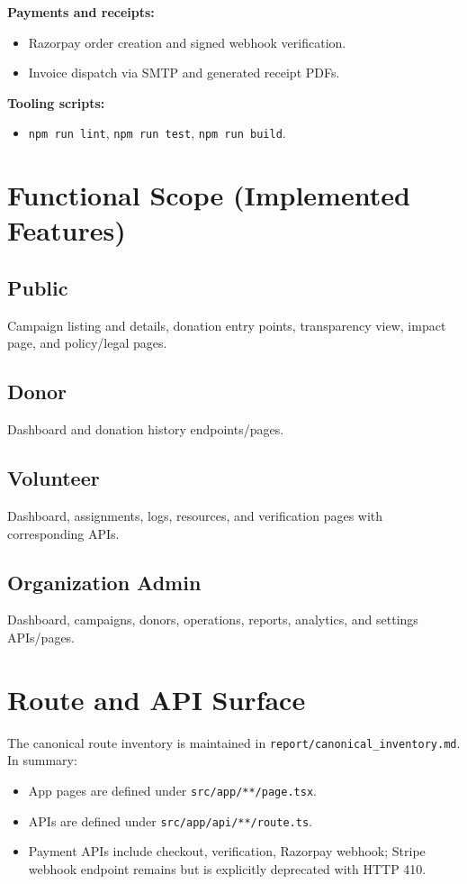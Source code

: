 \documentclass[12pt,a4paper]{article}
\begin{document}
\textbf{Payments and receipts:}
\begin{itemize}
  \item Razorpay order creation and signed webhook verification.
  \item Invoice dispatch via SMTP and generated receipt PDFs.
\end{itemize}

\textbf{Tooling scripts:}
\begin{itemize}
  \item \texttt{npm run lint}, \texttt{npm run test}, \texttt{npm run build}.
\end{itemize}

\section{Functional Scope (Implemented Features)}
\subsection{Public}
Campaign listing and details, donation entry points, transparency view, impact page, and policy/legal pages.

\subsection{Donor}
Dashboard and donation history endpoints/pages.

\subsection{Volunteer}
Dashboard, assignments, logs, resources, and verification pages with corresponding APIs.

\subsection{Organization Admin}
Dashboard, campaigns, donors, operations, reports, analytics, and settings APIs/pages.

\section{Route and API Surface}
The canonical route inventory is maintained in \texttt{report/canonical\_inventory.md}. In summary:
\begin{itemize}
  \item App pages are defined under \texttt{src/app/**/page.tsx}.
  \item APIs are defined under \texttt{src/app/api/**/route.ts}.
  \item Payment APIs include checkout, verification, Razorpay webhook; Stripe webhook endpoint remains but is explicitly deprecated with HTTP 410.
\end{itemize}
\end{document}
